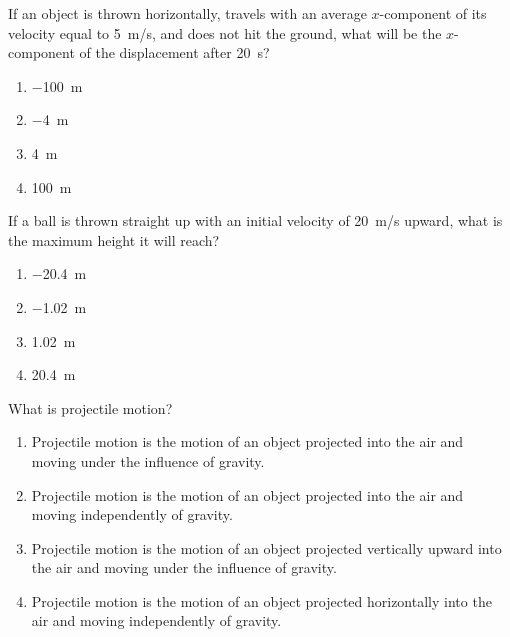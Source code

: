 \documentclass[main-physics.tex]{subfiles}
\begin{document}
\begin{exercise} \label{EykTi8}
    If an object is thrown horizontally, travels with an average $x$-component of its velocity equal to \SI{5}{m/s}, and does not hit the ground, what will be the $x$-component of the displacement after \SI{20}{s}? 

    \begin{enumerate}[label=\Alph*.]
        \item \SI{-100}{m}
        \item \SI{-4}{m}
        \item \SI{4}{m}
        \item \SI{100}{m}
    \end{enumerate}
\end{exercise}

\begin{exercise} \label{V9LJjv}
    If a ball is thrown straight up with an initial velocity of \SI{20}{m/s} upward, what is the maximum height it will reach?

    \begin{enumerate}[label=\Alph*.]
        \item \SI{-20.4}{m}
        \item \SI{-1.02}{m}
        \item \SI{1.02}{m}
        \item \SI{20.4}{m}
    \end{enumerate}
\end{exercise}

\begin{exercise} \label{nmtty2}
    What is projectile motion?
    
    \begin{enumerate}[label=\Alph*.]
        \item Projectile motion is the motion of an object projected into the air and moving under the influence of gravity.
        \item Projectile motion is the motion of an object projected into the air and moving independently of gravity.
        \item Projectile motion is the motion of an object projected vertically upward into the air and moving under the influence of gravity.
        \item Projectile motion is the motion of an object projected horizontally into the air and moving independently of gravity.
    \end{enumerate}
\end{exercise}
\end{document}
